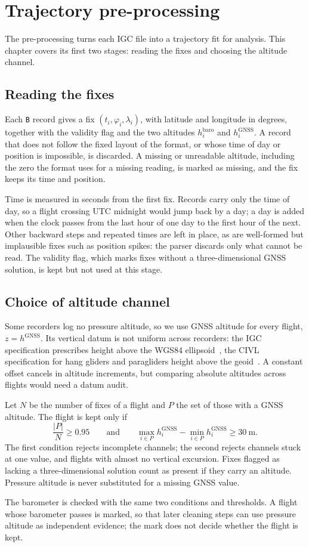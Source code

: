 \chapter{Trajectory pre-processing}
\label{ch:preproc}

The pre-processing turns each IGC file into a trajectory fit for analysis. This
chapter covers its first two stages: reading the fixes and choosing the altitude
channel.

\section{Reading the fixes}
\label{sec:parsing}

Each \texttt{B} record gives a fix $(t_i,\varphi_i,\lambda_i)$, with latitude and
longitude in degrees, together with the validity flag and the two altitudes
$h_i^{\mathrm{baro}}$ and $h_i^{\mathrm{GNSS}}$. A record that does not follow the
fixed layout of the format, or whose time of day or position is impossible, is
discarded. A missing or unreadable altitude,
including the zero the format uses for a missing reading, is marked as missing, and
the fix keeps its time and position.

Time is measured in seconds from the first fix. Records carry only the time of day,
so a flight crossing UTC midnight would jump back by a day; a day is added when the
clock passes from the last hour of one day to the first hour of the next. Other
backward steps and repeated times are left in place, as are well-formed but implausible fixes such as position
spikes: the parser discards only what cannot be read. The validity flag, which marks
fixes without a three-dimensional GNSS solution, is kept but not used at this stage.

\section{Choice of altitude channel}
\label{sec:altchannel}

Some recorders log no pressure altitude, so we use GNSS altitude for every flight,
$z=h^{\mathrm{GNSS}}$. Its vertical datum is not uniform across recorders: the IGC
specification prescribes height above the WGS84 ellipsoid~\cite{fai_igc_spec}, the
CIVL specification for hang gliders and paragliders height above the
geoid~\cite{fai_civl_s7h_2024}. A constant offset cancels in altitude increments, but
comparing absolute altitudes across flights would need a datum audit.

Let $N$ be the number of fixes of a flight and $P$ the set of those with a GNSS
altitude. The flight is kept only if
\begin{equation}
  \frac{|P|}{N}\geq0.95
  \qquad\text{and}\qquad
  \max_{i\in P}h_i^{\mathrm{GNSS}}-\min_{i\in P}h_i^{\mathrm{GNSS}}\geq\SI{30}{\metre}.
  \label{eq:gnss-admission}
\end{equation}
The first condition rejects incomplete channels; the second rejects channels stuck at
one value, and flights with almost no vertical excursion. Fixes flagged as lacking a
three-dimensional solution count as present if they carry an altitude. Pressure
altitude is never substituted for a missing GNSS value.

The barometer is checked with the same two conditions and thresholds. A flight whose
barometer passes is marked, so that later cleaning steps can use pressure altitude as
independent evidence; the mark does not decide whether the flight is kept.
